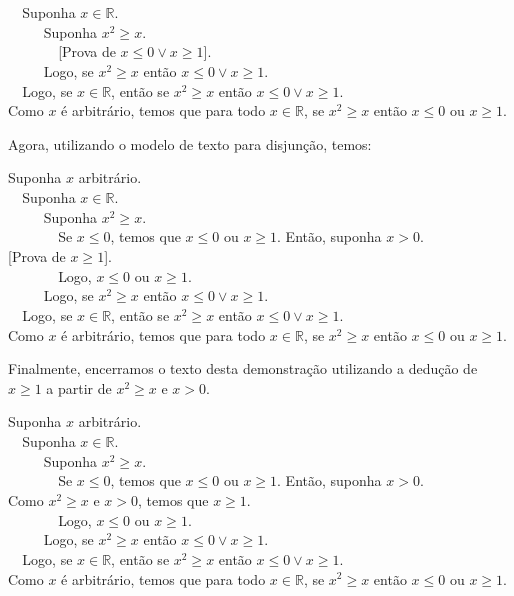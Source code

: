 \begin{Example}
\begin{flushleft}
\verb|  |Suponha $x\in\mathbb{R}$.\\
\verb|     |Suponha $x^2 \geq x$.\\
\verb|       |[Prova de $x \leq 0 \lor x \geq 1$].\\
\verb|     |Logo, se $x^2\geq x$ então $x \leq 0 \lor x \geq 1$.\\
\verb|  |Logo, se $x\in\mathbb{R}$, então se $x^2\geq x$ então $x \leq 0 \lor x \geq 1$.\\
Como $x$ é arbitrário, temos que para todo $x\in\mathbb{R}$, se $x^2 \geq x$ então $x \leq 0$ ou
  $x\geq 1$.
\end{flushleft}
Agora, utilizando o modelo de texto para disjunção, temos:
\begin{flushleft}
Suponha $x$ arbitrário.\\
\verb|  |Suponha $x\in\mathbb{R}$.\\
\verb|     |Suponha $x^2 \geq x$.\\
\verb|       |Se $x\leq 0$, temos que $x \leq 0$ ou $x \geq 1$. Então,
suponha $x >0$.
\verb|          |[Prova de $x \geq 1$].\\
\verb|       |Logo, $x \leq 0$ ou $x \geq 1$.\\
\verb|     |Logo, se $x^2\geq x$ então $x \leq 0 \lor x \geq 1$.\\
\verb|  |Logo, se $x\in\mathbb{R}$, então se $x^2\geq x$ então $x \leq 0 \lor x \geq 1$.\\
Como $x$ é arbitrário, temos que para todo $x\in\mathbb{R}$, se $x^2 \geq x$ então $x \leq 0$ ou
  $x\geq 1$.
\end{flushleft}
Finalmente, encerramos o texto desta demonstração utilizando a dedução
de $x\geq 1$ a partir de $x^2 \geq x$ e $x > 0$.
\begin{flushleft}
Suponha $x$ arbitrário.\\
\verb|  |Suponha $x\in\mathbb{R}$.\\
\verb|     |Suponha $x^2 \geq x$.\\
\verb|       |Se $x\leq 0$, temos que $x \leq 0$ ou $x \geq 1$. Então,
suponha $x >0$.
\verb|          |Como $x^2 \geq x$ e $x > 0$, temos que $x \geq 1$.\\
\verb|       |Logo, $x \leq 0$ ou $x \geq 1$.\\
\verb|     |Logo, se $x^2 \geq x$ então $x \leq 0 \lor x \geq 1$.\\
\verb|  |Logo, se $x\in\mathbb{R}$, então se $x^2\geq x$ então $x \leq 0 \lor x \geq 1$.\\
Como $x$ é arbitrário, temos que para todo $x\in\mathbb{R}$, se $x^2 \geq x$ então $x \leq 0$ ou
  $x\geq 1$.
\end{flushleft}
\end{Example}

